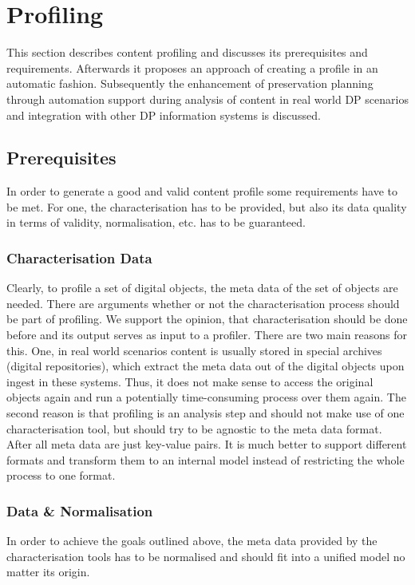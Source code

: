 \section{Profiling}
\label{sec:content_profiling}
This section describes content profiling and discusses its prerequisites and requirements. Afterwards it proposes an approach of creating a profile in an automatic fashion. Subsequently the enhancement of preservation planning through automation support during analysis of content in real world DP scenarios and integration with other DP information systems is discussed.

\subsection{Prerequisites}
In order to generate a good and valid content profile some requirements have to be met. For one, the characterisation has to be provided, but also its data quality in terms of validity, normalisation, etc. has to be guaranteed.

\subsubsection{Characterisation Data}
Clearly, to profile a set of digital objects, the meta data of the set of objects are needed. There are arguments whether or not the characterisation process should be part of profiling. We support the opinion, that characterisation should be done before and its output serves as input to a profiler. There are two main reasons for this. One, in real world scenarios content is usually stored in special archives (digital repositories), which extract the meta data out of the digital objects upon ingest in these systems. Thus, it does not make sense to access the original objects again and run a potentially time-consuming process over them again. The second reason is that profiling is an analysis step and should not make use of one characterisation tool, but should try to be agnostic to the meta data format. After all meta data are just key-value pairs. It is much better to support different formats and transform them to an internal model instead of restricting the whole process to one format.

\subsubsection{Data \& Normalisation}
In order to achieve the goals outlined above, the meta data provided by the characterisation tools has to be normalised and should fit into a unified model no matter its origin.

